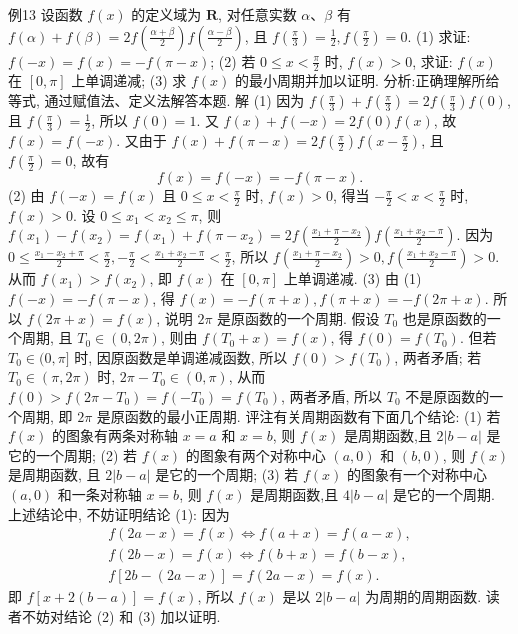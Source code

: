 例13 设函数 $f(x)$ 的定义域为 $\mathbf{R}$, 对任意实数 $\alpha 、 \beta$ 有
$f(\alpha)+f(\beta)=2 f\left(\frac{\alpha+\beta}{2}\right) f\left(\frac{\alpha-\beta}{2}\right)$, 且 $f\left(\frac{\pi}{3}\right)=\frac{1}{2}, f\left(\frac{\pi}{2}\right)=0$.
(1) 求证: $f(-x)=f(x)=-f(\pi-x)$;
(2) 若 $0 \leqslant x<\frac{\pi}{2}$ 时, $f(x)>0$, 求证: $f(x)$ 在 $[0, \pi]$ 上单调递减;
(3) 求 $f(x)$ 的最小周期并加以证明.
分析:正确理解所给等式, 通过赋值法、定义法解答本题.
解 (1) 因为 $f\left(\frac{\pi}{3}\right)+f\left(\frac{\pi}{3}\right)=2 f\left(\frac{\pi}{3}\right) f(0)$, 且 $f\left(\frac{\pi}{3}\right)=\frac{1}{2}$, 所以 $f(0)=1$.
又 $f(x)+f(-x)=2 f(0) f(x)$, 故 $f(x)=f(-x)$.
又由于 $f(x)+f(\pi-x)=2 f\left(\frac{\pi}{2}\right) f\left(x-\frac{\pi}{2}\right)$, 且 $f\left(\frac{\pi}{2}\right)=0$, 故有
$$
f(x)=f(-x)=-f(\pi-x) .
$$
(2) 由 $f(-x)=f(x)$ 且 $0 \leqslant x<\frac{\pi}{2}$ 时, $f(x)>0$, 得当 $-\frac{\pi}{2}<x<\frac{\pi}{2}$ 时, $f(x)>0$.
设 $0 \leqslant x_1<x_2 \leqslant \pi$, 则 $f\left(x_1\right)-f\left(x_2\right)=f\left(x_1\right)+f\left(\pi-x_2\right)= 2 f\left(\frac{x_1+\pi-x_2}{2}\right) f\left(\frac{x_1+x_2-\pi}{2}\right)$.
因为 $0 \leqslant \frac{x_1-x_2+\pi}{2}<\frac{\pi}{2},-\frac{\pi}{2}<\frac{x_1+x_2-\pi}{2}<\frac{\pi}{2}$, 所以 $f\left(\frac{x_1+\pi-x_2}{2}\right)>0, f\left(\frac{x_1+x_2-\pi}{2}\right)>0$. 从而 $f\left(x_1\right)>f\left(x_2\right)$, 即 $f(x)$ 在 $[0, \pi]$ 上单调递减.
(3) 由 (1) $f(-x)=-f(\pi-x)$, 得 $f(x)=-f(\pi+x), f(\pi+x)= -f(2 \pi+x)$.
所以 $f(2 \pi+x)=f(x)$, 说明 $2 \pi$ 是原函数的一个周期.
假设 $T_0$ 也是原函数的一个周期, 且 $T_0 \in(0,2 \pi)$, 则由 $f\left(T_0+x\right)= f(x)$, 得 $f(0)=f\left(T_0\right)$.
但若 $T_0 \in(0, \pi]$ 时, 因原函数是单调递减函数, 所以 $f(0)>f\left(T_0\right)$, 两者矛盾;
若 $T_0 \in(\pi, 2 \pi)$ 时, $2 \pi-T_0 \in(0, \pi)$, 从而 $f(0)>f\left(2 \pi-T_0\right)= f\left(-T_0\right)=f\left(T_0\right)$, 两者矛盾, 所以 $T_0$ 不是原函数的一个周期, 即 $2 \pi$ 是原函数的最小正周期.
评注有关周期函数有下面几个结论: (1) 若 $f(x)$ 的图象有两条对称轴 $x=a$ 和 $x=b$, 则 $f(x)$ 是周期函数,且 $2|b-a|$ 是它的一个周期;
(2) 若 $f(x)$ 的图象有两个对称中心 $(a, 0)$ 和 $(b, 0)$, 则 $f(x)$ 是周期函数, 且 $2|b-a|$ 是它的一个周期;
(3) 若 $f(x)$ 的图象有一个对称中心 $(a, 0)$ 和一条对称轴 $x=b$, 则 $f(x)$ 是周期函数,且 $4|b-a|$ 是它的一个周期.
上述结论中, 不妨证明结论 (1):
因为
$$
\begin{gathered}
f(2 a-x)=f(x) \Leftrightarrow f(a+x)=f(a-x), \\
f(2 b-x)=f(x) \Leftrightarrow f(b+x)=f(b-x), \\
f[2 b-(2 a-x)]=f(2 a-x)=f(x) .
\end{gathered}
$$
即 $f[x+2(b-a)]=f(x)$, 所以 $f(x)$ 是以 $2|b-a|$ 为周期的周期函数.
读者不妨对结论 (2) 和 (3) 加以证明.



